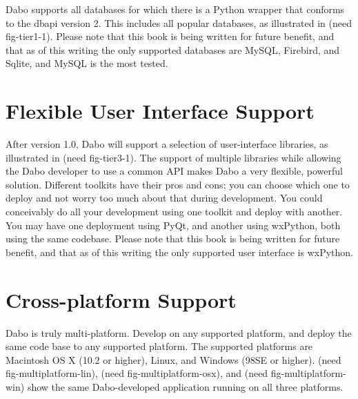 Dabo supports all databases for which there is a Python wrapper that conforms to the dbapi version 2. This includes all popular databases, as illustrated in (need fig-tier1-1). Please note that this book is being written for future benefit, and that as of this writing the only supported databases are MySQL, Firebird, and Sqlite, and MySQL is the most tested.

\section{Flexible User Interface Support}

After version 1.0, Dabo will support a selection of user-interface libraries, as illustrated in (need fig-tier3-1). The support of multiple libraries while allowing the Dabo developer to use a common API makes Dabo a very flexible, powerful solution. Different toolkits have their pros and cons; you can choose which one to deploy and not worry too much about that during development. You could conceivably do all your development using one toolkit and deploy with another. You may have one deployment using PyQt, and another using wxPython, both using the same codebase. Please note that this book is being written for future benefit, and that as of this writing the only supported user interface is wxPython.

\section{Cross-platform Support}

Dabo is truly multi-platform. Develop on any supported platform, and deploy the same code base to any supported platform. The supported platforms are Macintosh OS X (10.2 or higher), Linux, and Windows (98SE or higher). (need fig-multiplatform-lin), (need fig-multiplatform-osx), and (need fig-multiplatform-win) show the same Dabo-developed application running on all three platforms.
